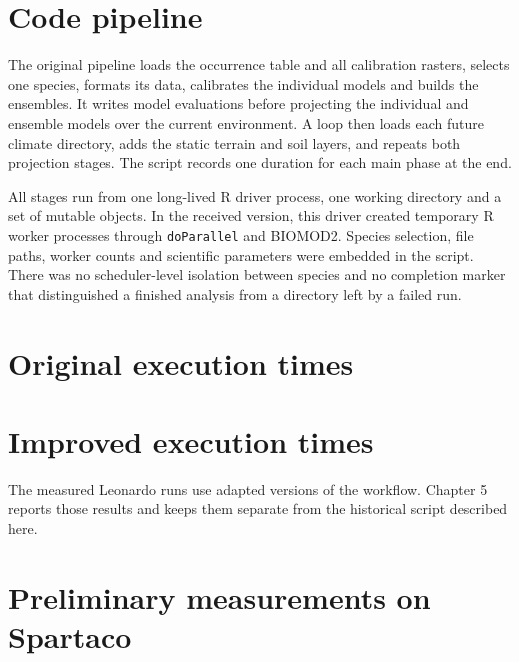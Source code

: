 \section{Code pipeline}

The original pipeline loads the occurrence table and all calibration rasters, selects one species, formats its data, calibrates the individual models and builds the ensembles. It writes model evaluations before projecting the individual and ensemble models over the current environment. A loop then loads each future climate directory, adds the static terrain and soil layers, and repeats both projection stages. The script records one duration for each main phase at the end.

All stages run from one long-lived R driver process, one working directory and a set of mutable objects. In the received version, this driver created temporary R worker processes through \texttt{doParallel} and BIOMOD2. Species selection, file paths, worker counts and scientific parameters were embedded in the script. There was no scheduler-level isolation between species and no completion marker that distinguished a finished analysis from a directory left by a failed run.

\section{Original execution times}


\section{Improved execution times}

The measured Leonardo runs use adapted versions of the workflow. Chapter 5 reports those results and keeps them separate from the historical script described here.


\section{Preliminary measurements on Spartaco}

